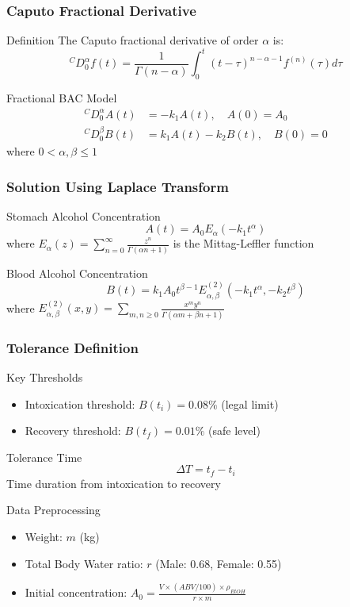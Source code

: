 \documentclass{beamer}
\begin{document}
\begin{frame}
\frametitle{Caputo Fractional Derivative}
\begin{block}{Definition}
The Caputo fractional derivative of order $\alpha$ is:
$$^C D_0^{\alpha} f(t) = \frac{1}{\Gamma(n-\alpha)} \int_0^t (t-\tau)^{n-\alpha-1} f^{(n)}(\tau) d\tau$$
\end{block}

\begin{block}{Fractional BAC Model}
\begin{align}
^C D_0^{\alpha} A(t) &= -k_1 A(t), \quad A(0) = A_0 \\
^C D_0^{\beta} B(t) &= k_1 A(t) - k_2 B(t), \quad B(0) = 0
\end{align}
where $0 < \alpha, \beta \leq 1$
\end{block}
\end{frame}

\begin{frame}
\frametitle{Solution Using Laplace Transform}
\begin{block}{Stomach Alcohol Concentration}
$$A(t) = A_0 E_{\alpha}(-k_1 t^{\alpha})$$
where $E_{\alpha}(z) = \sum_{n=0}^{\infty} \frac{z^n}{\Gamma(\alpha n + 1)}$ is the Mittag-Leffler function
\end{block}

\begin{block}{Blood Alcohol Concentration}
$$B(t) = k_1 A_0 t^{\beta-1} E_{\alpha,\beta}^{(2)}(-k_1 t^{\alpha}, -k_2 t^{\beta})$$
where $E_{\alpha,\beta}^{(2)}(x,y) = \sum_{m,n \geq 0} \frac{x^m y^n}{\Gamma(\alpha m + \beta n + 1)}$
\end{block}
\end{frame}

\begin{frame}
\frametitle{Tolerance Definition}
\begin{block}{Key Thresholds}
\begin{itemize}
    \item Intoxication threshold: $B(t_i) = 0.08\%$ (legal limit)
    \item Recovery threshold: $B(t_f) = 0.01\%$ (safe level)
\end{itemize}
\end{block}

\begin{block}{Tolerance Time}
$$\Delta T = t_f - t_i$$
Time duration from intoxication to recovery
\end{block}

\begin{block}{Data Preprocessing}
\begin{itemize}
    \item Weight: $m$ (kg)
    \item Total Body Water ratio: $r$ (Male: 0.68, Female: 0.55)
    \item Initial concentration: $A_0 = \frac{V \times (ABV/100) \times \rho_{EtOH}}{r \times m}$
\end{itemize}
\end{block}
\end{frame}
\end{document}
